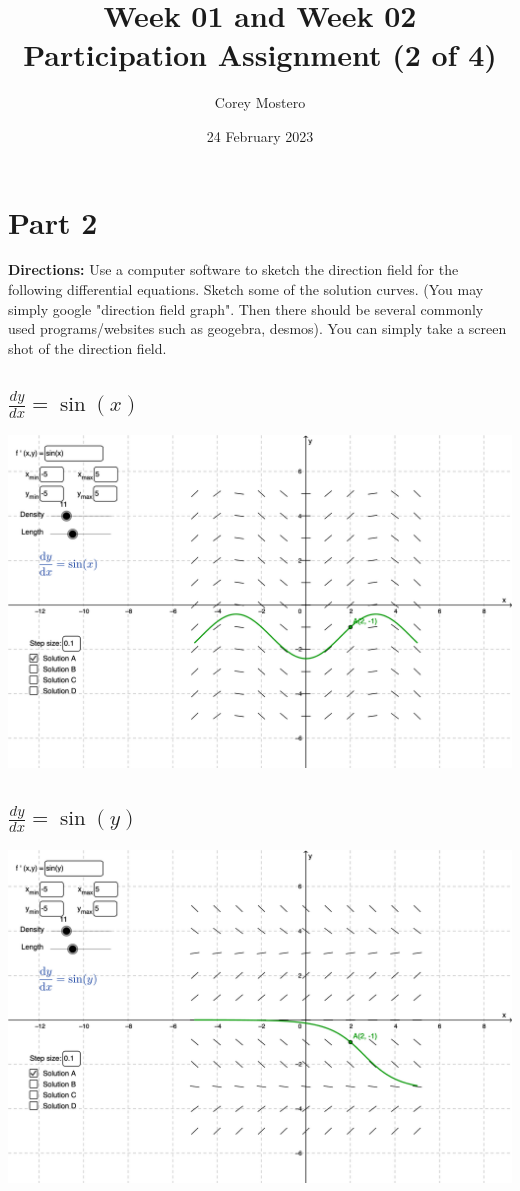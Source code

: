 \documentclass{article}
\title{Week 01 and Week 02 Participation Assignment (2 of 4)}
\date{24 February 2023}
\author{Corey Mostero}
\begin{document}
\maketitle
\newpage

\tableofcontents

\section{Part 2}

\textbf{Directions:} Use a computer software to sketch the direction field for the following differential equations. Sketch some of the solution curves. (You may simply google "direction field graph". Then there should be several commonly used programs/websites such as geogebra, desmos). You can simply take a screen shot of the direction field.

\subsection{ $ \frac{dy}{dx} = \sin(x) $ }

\includegraphics[width=\textwidth]{graph_1.png}

\subsection{ $ \frac{dy}{dx} = \sin(y) $ }

\includegraphics[width=\textwidth]{graph_2.png}
\end{document}
